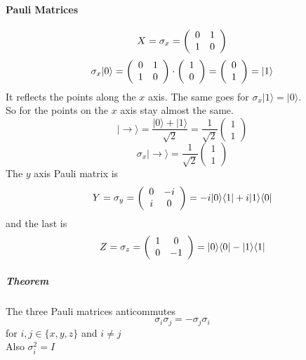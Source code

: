 \documentclass[10pt]{report}
\begin{document}
\paragraph{Pauli Matrices} $$X = \sigma_x = \left(\begin{array}{c c}
0&1\\1&0
\end{array}\right)$$
$$\sigma_x|0\rangle = \left(\begin{array}{c c}
0&1\\1&0
\end{array}\right)\cdot\left(\begin{array}{c}
1\\0
\end{array}\right) = \left(\begin{array}{c}
0\\1
\end{array}\right) =|1\rangle$$
It reflects the points along the $x$ axis. The same goes for $\sigma_x|1\rangle = |0\rangle$.\\
So for the points on the $x$ axis stay almost the same.
$$|\rightarrow\rangle = \frac{|0\rangle + |1\rangle}{\sqrt{2}} = \frac{1}{\sqrt{2}}\left(\begin{array}{c}
1\\1
\end{array}\right)$$
$$\sigma_x|\rightarrow\rangle = \frac{1}{\sqrt{2}}\left(\begin{array}{c}
1\\1
\end{array}\right)$$
The $y$ axis Pauli matrix is $$Y = \sigma_y = \left(\begin{array}{c c}
0&-i\\i&0
\end{array}\right) = -i|0\rangle\langle1| + i |1\rangle\langle0|$$
and the last is $$Z = \sigma_z = \left(\begin{array}{c c}
1&0\\0&-1
\end{array}\right) = |0\rangle\langle0| - |1\rangle\langle1|$$
\subparagraph{Theorem} The three Pauli matrices anticommutes
$$\sigma_i\sigma_j = -\sigma_j\sigma_i$$
for $i,j\in\{x,y,z\}$ and $i\neq j$\\
Also $\sigma_i^2 = I$
\end{document}
